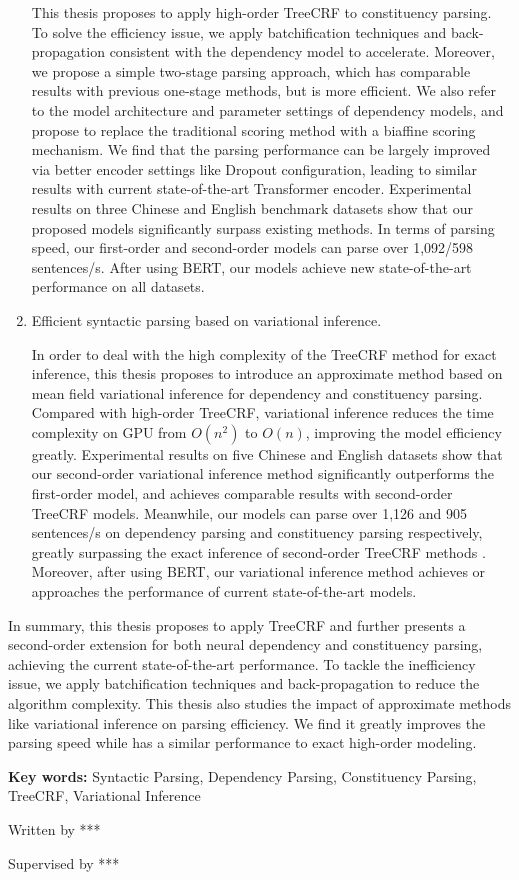 \begin{eabstract}
\begin{enumerate}
		      This thesis proposes to apply high-order TreeCRF to constituency parsing.
		      To solve the efficiency issue, we apply batchification techniques and back-propagation consistent with the dependency model to accelerate.
		      Moreover, we propose a simple two-stage parsing approach, which has comparable results with previous one-stage methods, but is more efficient.
		      We also refer to the model architecture and parameter settings of dependency models, and propose to replace the traditional scoring method with a biaffine scoring mechanism.
		      We find that the parsing performance can be largely improved via better encoder settings like Dropout configuration, leading to similar results with current state-of-the-art Transformer encoder.
		      Experimental results on three Chinese and English benchmark datasets show that our proposed models significantly surpass existing methods.
		      In terms of parsing speed, our first-order and second-order models can parse over 1,092/598 sentences/s.
		      After using BERT, our models achieve new state-of-the-art performance on all datasets.
		      
		\item Efficient syntactic parsing based on variational inference.
		      
		      In order to deal with the high complexity of the TreeCRF method for exact inference, this thesis proposes to introduce an approximate method based on mean field variational inference for dependency and constituency parsing.
		      Compared with high-order TreeCRF, variational inference reduces the time complexity on GPU from $O(n^2)$ to $O(n)$, improving the model efficiency greatly.
		      Experimental results on five Chinese and English datasets show that our second-order variational inference method significantly outperforms the first-order model, and achieves comparable results with second-order TreeCRF models.
		      Meanwhile, our models can parse over 1,126 and 905 sentences/s on dependency parsing and constituency parsing respectively, greatly surpassing the exact inference of second-order TreeCRF methods .
		      Moreover, after using BERT, our variational inference method achieves or approaches the performance of current state-of-the-art models.
		      
	\end{enumerate}
	
	In summary, this thesis proposes to apply TreeCRF and further presents a second-order extension for both neural dependency and constituency parsing, achieving the current state-of-the-art performance.
	To tackle the inefficiency issue, we apply batchification techniques and back-propagation to reduce the algorithm complexity.
	This thesis also studies the impact of approximate methods like variational inference on parsing efficiency.
	We find it greatly improves the parsing speed while has a similar performance to exact high-order modeling.
	
	\vskip 21bp
	{\bf{} Key words: }
	Syntactic Parsing,
	Dependency Parsing,
	Constituency Parsing,
	TreeCRF,
	Variational Inference
\end{eabstract}

\begin{flushright}
	Written by ***
	
	Supervised by ***
\end{flushright}
